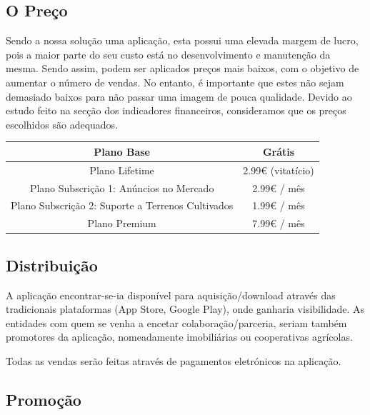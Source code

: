 \documentclass[11pt]{article}
\begin{document}
	\pagebreak
	
	\large
	\subsection{O Preço}
	
	\normalsize
	
	Sendo a nossa solução uma aplicação, esta possui uma elevada margem de lucro, pois a maior parte do seu custo está no desenvolvimento e manutenção da mesma. Sendo assim, podem ser aplicados preços mais baixos, com o objetivo de aumentar o número de vendas. No entanto, é importante que estes não sejam demasiado baixos para não passar uma imagem de pouca qualidade. Devido ao estudo feito na secção dos indicadores financeiros, consideramos que os preços escolhidos são adequados.
	
	\begin{center}
		\begin{tabular}{ | c | c | }
			\hline
			Plano Base & Grátis \\
			\hline
			Plano Lifetime & 2.99€ (vitatício) \\
			\hline
			Plano Subscrição 1: Anúncios no Mercado & 2.99€ / mês \\
			\hline 
			Plano Subscrição 2: Suporte a Terrenos Cultivados & 1.99€ / mês \\
			\hline   
			Plano Premium & 7.99€ / mês \\
			\hline
		\end{tabular}
	\end{center}
	
	
	\large
	\subsection{Distribuição}
	
	\normalsize
	
	A aplicação encontrar-se-ia disponível para aquisição/download através das tradicionais plataformas (App Store, Google Play), onde ganharia visibilidade. As entidades com quem se venha a encetar colaboração/parceria, seriam também promotores da aplicação, nomeadamente imobiliárias ou cooperativas agrícolas.
	
	Todas as vendas serão feitas através de pagamentos eletrónicos na aplicação.
	
	
	\large
	\subsection{Promoção}
	
\end{document}
